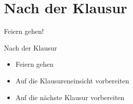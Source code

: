 \section{Nach der Klausur}

\begin{frame}[standout]
    \Huge
    Feiern gehen!
\end{frame}

\begin{frame}[c]{Nach der Klausur}
    \Large
    \begin{itemize}[<+(1)->]
        \item Feiern gehen
        \item Auf die Klausureneinsicht vorbereiten
        \item Auf die nächste Klausur vorbereiten
    \end{itemize}
\end{frame}


